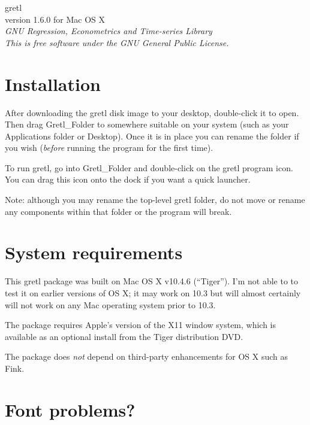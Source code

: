 \documentclass[11pt]{article}
\begin{document}
\begin{center}
{\color{gold} \titlefont gretl} \\[1ex]
version 1.6.0 for Mac OS X \\[2ex]

\textit{GNU Regression, Econometrics and Time-series Library\\
  This is free software under the GNU General Public License.}

\end{center}

\section{Installation}
\label{sec:install}

After downloading the gretl disk image to your desktop, double-click it
to open. Then drag \textsf{Gretl\_Folder} to somewhere suitable on your
system (such as your Applications folder or Desktop).  Once it is in
place you can rename the folder if you wish (\textit{before} running the
program for the first time).

To run gretl, go into \textsf{Gretl\_Folder} and double-click on the
gretl program icon.  You can drag this icon onto the dock if you want
a quick launcher.  

Note: although you may rename the top-level gretl folder, do not move
or rename any components within that folder or the program will break.

\section{System requirements}
\label{sec:os}

This gretl package was built on Mac OS X v10.4.6 (``Tiger'').  I'm not
able to to test it on earlier versions of OS X; it may work on 10.3
but will almost certainly will not work on any Mac operating system
prior to 10.3.

The package requires Apple's version of the X11 window system, which
is available as an optional install from the Tiger distribution DVD.

The package does \textit{not} depend on third-party enhancements for
OS X such as \textsf{Fink}.

\section{Font problems?}
\label{sec:fonts}
\end{document}
